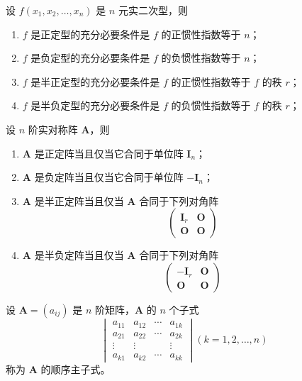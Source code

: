 \begin{theorem}
    设 $f(x_1, x_2, \ldots, x_n)$ 是 $n$ 元实二次型，则
    \begin{enumerate}
        \item $f$ 是正定型的充分必要条件是 $f$ 的正惯性指数等于 $n$；
        \item $f$ 是负定型的充分必要条件是 $f$ 的负惯性指数等于 $n$；
        \item $f$ 是半正定型的充分必要条件是 $f$ 的正惯性指数等于 $f$ 的秩 $r$；
        \item $f$ 是半负定型的充分必要条件是 $f$ 的负惯性指数等于 $f$ 的秩 $r$；
    \end{enumerate}
\end{theorem}

\begin{theorem}
    设 $n$ 阶实对称阵 $\bm{A}$，则
    \begin{enumerate}
        \item $\bm{A}$ 是正定阵当且仅当它合同于单位阵 $\bm{I}_n$；
        \item $\bm{A}$ 是负定阵当且仅当它合同于单位阵 $-\bm{I}_n$；
        \item $\bm{A}$ 是半正定阵当且仅当 $\bm{A}$ 合同于下列对角阵
              \[
                  \begin{pmatrix}
                      \bm{I}_{r} & \bm{O} \\
                      \bm{O}     & \bm{O}
                  \end{pmatrix}
              \]
        \item $\bm{A}$ 是半负定阵当且仅当 $\bm{A}$ 合同于下列对角阵
              \[
                  \begin{pmatrix}
                      -\bm{I}_{r} & \bm{O} \\
                      \bm{O}      & \bm{O}
                  \end{pmatrix}
              \]
    \end{enumerate}
\end{theorem}

\begin{definition}
    设 $\bm{A} = (a_{ij})$ 是 $n$ 阶矩阵，$\bm{A}$ 的 $n$ 个子式
    \[
        \begin{vmatrix}
            a_{11} & a_{12} & \cdots & a_{1k} \\
            a_{21} & a_{22} & \cdots & a_{2k} \\
            \vdots & \vdots & \      & \vdots \\
            a_{k1} & a_{k2} & \cdots & a_{kk}
        \end{vmatrix}
        (k = 1, 2, \ldots, n)
    \]
    称为 $\bm{A}$ 的顺序主子式。
\end{definition}

